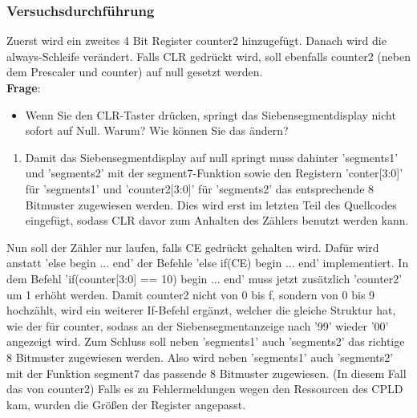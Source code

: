\documentclass[12pt,a4paper]{article}
\begin{document}
\subsubsection*{Versuchsdurchführung}
Zuerst wird ein zweites 4 Bit Register counter2 hinzugefügt.
Danach wird die always-Schleife verändert. Falls CLR gedrückt wird, soll ebenfalls counter2 (neben dem Prescaler und counter) auf null gesetzt werden.\\
\textbf{Frage}:
\begin{itemize}
\item Wenn Sie den CLR-Taster drücken, springt das Siebensegmentdisplay nicht sofort auf Null. Warum? Wie können Sie das ändern?
\end{itemize}
\begin{enumerate}
\item
Damit das Siebensegmentdisplay auf null springt muss dahinter 'segments1' und 'segments2' mit der segment7-Funktion sowie den Registern 'conter[3:0]' für 'segments1' und 'counter2[3:0]' für 'segments2'  das entsprechende 8 Bitmuster zugewiesen werden. Dies wird erst im letzten Teil des Quellcodes eingefügt, sodass CLR davor zum Anhalten des Zählers benutzt werden kann.
\end{enumerate}
Nun soll der Zähler nur laufen, falls CE gedrückt gehalten wird. Dafür wird anstatt 'else begin ... end' der Befehle 'else if(CE) begin ... end' implementiert. In dem Befehl 'if(counter[3:0] == 10) begin ... end' muss jetzt zusätzlich 'counter2' um 1 erhöht werden. Damit counter2 nicht von 0 bis f, sondern von 0 bis 9 hochzählt, wird ein weiterer If-Befehl ergänzt, welcher die gleiche Struktur hat, wie der für counter, sodass an der Siebensegmentanzeige nach '99' wieder '00' angezeigt wird. Zum Schluss soll neben 'segments1' auch 'segments2' das richtige 8 Bitmuster zugewiesen werden. Also wird neben 'segments1' auch 'segments2' mit der Funktion segment7 das passende 8 Bitmuster zugewiesen. (In diesem Fall das von counter2)
Falls es zu Fehlermeldungen wegen den Ressourcen des CPLD kam, wurden die Größen der Register angepasst.
\end{document}
